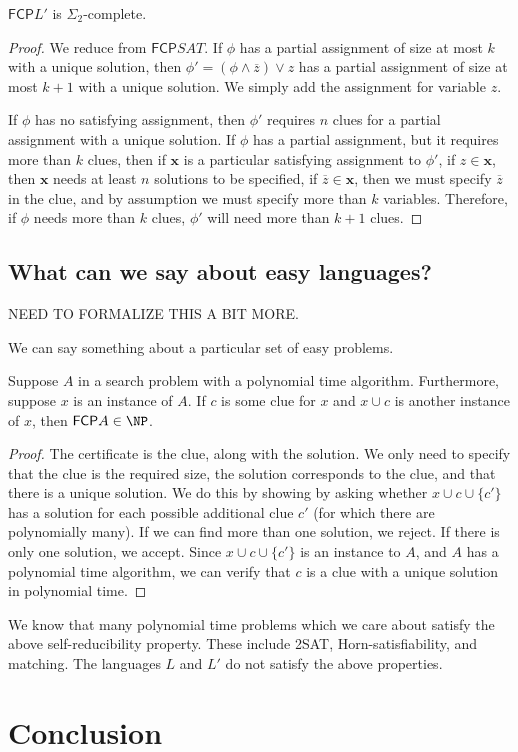 \documentclass[runningheads,a4paper]{llncs}
\begin{document}
\begin{proposition}
$\mathsf{FCP} L'$ is $\Sigma_2$-complete. 
\end{proposition}

\begin{proof}
We reduce from $\mathsf{FCP} SAT$. If $\phi$ has a partial assignment of size at most $k$ with a unique solution, then $\phi' = (\phi \wedge \overline{z}) \vee z$ has a partial assignment of size at most $k+1$ with a unique solution. We simply add the assignment for variable $z$. 

If $\phi$ has no satisfying assignment, then $\phi'$ requires $n$ clues for a partial assignment with a unique solution. If $\phi$ has a partial assignment, but it requires more than $k$ clues, then if $\textbf{x}$ is a particular satisfying assignment to $\phi'$, if $z  \in \textbf{x}$, then $\textbf{x}$ needs at least $n$ solutions to be specified, if $\overline{z} \in \textbf{x}$, then we must specify $\overline{z}$ in the clue, and by assumption we must specify more than $k$ variables. Therefore, if $\phi$ needs more than $k$ clues, $\phi'$ will need more than $k+1$ clues. 
\end{proof}

\subsection{What can we say about easy languages?}

NEED TO FORMALIZE THIS A BIT MORE.

We can say something about a particular set of easy problems. 
\begin{proposition}
Suppose $A$ in a search problem with a polynomial time algorithm. Furthermore, suppose $x$ is an instance of $A$. If $c$ is some clue for $x$ and $x \cup c$ is another instance of $x$, then $\mathsf{FCP} A \in \NP$. 
\end{proposition}

\begin{proof}
The certificate is the clue, along with the solution. We only need to specify that the clue is the required size, the solution corresponds to the clue, and that there is a unique solution. We do this by showing by asking whether $x \cup c \cup \{ c' \}$ has a solution for each possible additional clue $c'$ (for which there are polynomially many). If we can find more than one solution, we reject. If there is only one solution, we accept. Since $x \cup c \cup \{ c' \}$ is an instance to $A$, and $A$ has a polynomial time algorithm, we can verify that $c$ is a clue with a unique solution in polynomial time.
\end{proof}

We know that many polynomial time problems which we care about satisfy the above self-reducibility property. These include 2SAT, Horn-satisfiability, and matching. The languages $L$ and $L'$ do not satisfy the above properties.

\section{Conclusion}
\label{sec:conclusion}




\end{document}
